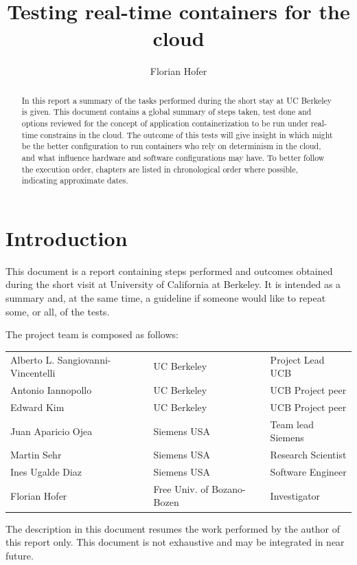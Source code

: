 \documentclass[]{scrartcl}
\title{Testing real-time containers for the cloud}
\author{Florian Hofer}
\date{}
\begin{document}
\maketitle

\begin{abstract}
	In this report a summary of the tasks performed during the short stay at UC Berkeley is given.
	This document contains a global summary of steps taken, test done and options reviewed for the concept of application containerization to be run under real-time constrains in the cloud. The outcome of this tests will give insight in which might be the better configuration to run containers who rely on determinism in the cloud, and what influence hardware and software configurations may have.
	To better follow the execution order, chapters are listed in chronological order  where possible, indicating approximate dates.
\end{abstract}

\section{Introduction}

This document is a report containing steps performed and outcomes obtained during the short visit at University of California at Berkeley. It is intended as a summary and, at the same time, a guideline if someone would like to repeat some, or all, of the tests.

The project team is composed as follows:

\begin{table}[H]
	\begin{tabular}{l l l}
		Alberto L. Sangiovanni-Vincentelli & UC Berkeley & Project Lead UCB \\
		Antonio Iannopollo & UC Berkeley & UCB Project peer \\
		Edward Kim & UC Berkeley & UCB Project peer \\
		Juan Aparicio Ojea & Siemens USA & Team lead Siemens\\
		Martin Sehr & Siemens USA & Research Scientist\\
		Ines Ugalde Diaz & Siemens USA & Software Engineer \\
		Florian Hofer & Free Univ. of Bozano-Bozen & Investigator \\		
	\end{tabular}
\end{table}

The description in this document resumes the work performed by the author of this report only.
This document is not exhaustive and may be integrated in near future.
\end{document}
